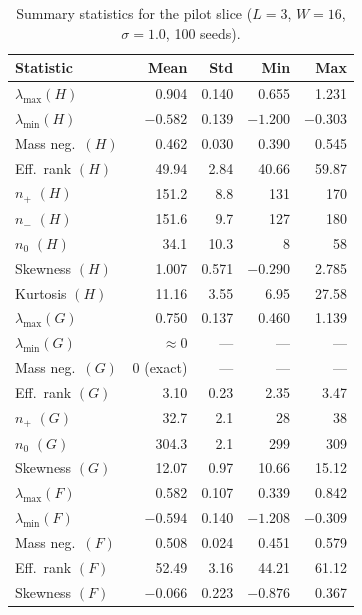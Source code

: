 \documentclass[12pt,a4paper]{article}
\begin{document}
\begin{table}[H]
  \centering
  \caption{Summary statistics for the pilot slice
           ($L=3$, $W=16$, $\sigma=1.0$, 100 seeds).}
  \label{tab:pilot_stats}
  \begin{tabular}{@{}lrrrr@{}}
    \toprule
    Statistic & Mean & Std & Min & Max \\
    \midrule
    $\lambda_{\max}(H)$           & 0.904 & 0.140 & 0.655 & 1.231 \\
    $\lambda_{\min}(H)$           & $-0.582$ & 0.139 & $-1.200$ & $-0.303$ \\
    Mass neg.\ $(H)$              & 0.462 & 0.030 & 0.390 & 0.545 \\
    Eff.\ rank $(H)$              & 49.94 & 2.84 & 40.66 & 59.87 \\
    $n_+$ $(H)$                   & 151.2 & 8.8 & 131 & 170 \\
    $n_-$ $(H)$                   & 151.6 & 9.7 & 127 & 180 \\
    $n_0$ $(H)$                   & 34.1 & 10.3 & 8 & 58 \\
    Skewness $(H)$                & 1.007 & 0.571 & $-0.290$ & 2.785 \\
    Kurtosis $(H)$                & 11.16 & 3.55 & 6.95 & 27.58 \\
    \midrule
    $\lambda_{\max}(G)$           & 0.750 & 0.137 & 0.460 & 1.139 \\
    $\lambda_{\min}(G)$           & $\approx 0$ & --- & --- & --- \\
    Mass neg.\ $(G)$              & 0 (exact) & --- & --- & --- \\
    Eff.\ rank $(G)$              & 3.10 & 0.23 & 2.35 & 3.47 \\
    $n_+$ $(G)$                   & 32.7 & 2.1 & 28 & 38 \\
    $n_0$ $(G)$                   & 304.3 & 2.1 & 299 & 309 \\
    Skewness $(G)$                & 12.07 & 0.97 & 10.66 & 15.12 \\
    \midrule
    $\lambda_{\max}(F)$           & 0.582 & 0.107 & 0.339 & 0.842 \\
    $\lambda_{\min}(F)$           & $-0.594$ & 0.140 & $-1.208$ & $-0.309$ \\
    Mass neg.\ $(F)$              & 0.508 & 0.024 & 0.451 & 0.579 \\
    Eff.\ rank $(F)$              & 52.49 & 3.16 & 44.21 & 61.12 \\
    Skewness $(F)$                & $-0.066$ & 0.223 & $-0.876$ & 0.367 \\
    \bottomrule
  \end{tabular}
\end{table}
\end{document}
